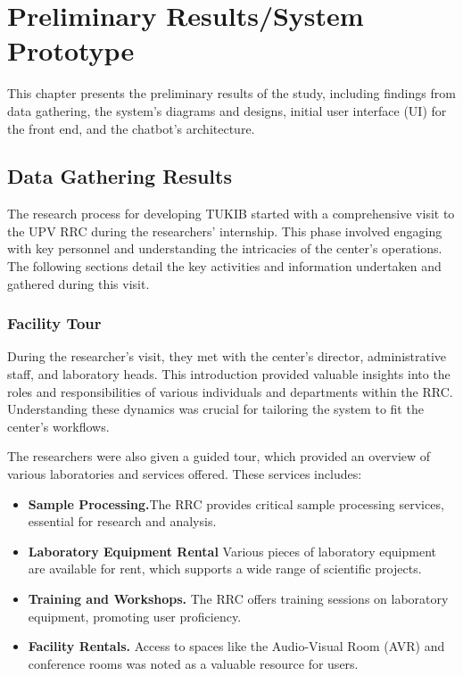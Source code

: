 \chapter{Preliminary Results/System Prototype}
This chapter presents the preliminary results of the study, including findings from data gathering, the system's diagrams and designs, initial user interface (UI) for the front end, and the chatbot's architecture.

\section{Data Gathering Results}
The research process for developing TUKIB started with a comprehensive visit to the UPV RRC during the researchers' internship. This phase involved engaging with key personnel and understanding the intricacies of the center's operations. The following sections detail the key activities and information undertaken and gathered during this visit.

\subsection{Facility Tour}
During the researcher's visit, they met with the center's director, administrative staff, and laboratory heads. This introduction provided valuable insights into the roles and responsibilities of various individuals and departments within the RRC. Understanding these dynamics was crucial for tailoring the system to fit the center’s workflows.

The researchers were also given a guided tour, which provided an overview of various laboratories and services offered. These services includes:

\begin{itemize}
	\item \textbf{Sample Processing.}The RRC provides critical sample processing services, essential for research and analysis.
	\item \textbf{Laboratory Equipment Rental} Various pieces of laboratory equipment are available for rent, which supports a wide range of scientific projects.
	\item \textbf{Training and Workshops.} The RRC offers training sessions on laboratory equipment, promoting user proficiency.
	\item \textbf{Facility Rentals.} Access to spaces like the Audio-Visual Room (AVR) and conference rooms was noted as a valuable resource for users.
\end{itemize}


